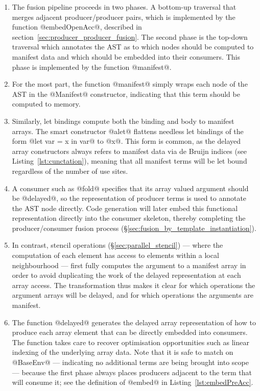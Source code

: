 \begin{enumerate}
\item The fusion pipeline proceeds in two phases. A bottom-up traversal that
    merges adjacent producer/producer pairs, which is implemented by the
    function @embedOpenAcc@, described in
    section~\ref{sec:producer_producer_fusion}. The second phase is the top-down
    traversal which annotates the AST as to which nodes should be computed to
    manifest data and which should be embedded into their consumers. This phase
    is implemented by the function @manifest@.

\item For the most part, the function @manifest@ simply wraps each node of the
    AST in the @Manifest@ constructor, indicating that this term should be
    computed to memory.

\item Similarly, let bindings compute both the binding and body to manifest
    arrays. The smart constructor @alet@ flattens needless let bindings of the
    form @let var = x in var@ to @x@. This form is common, as the delayed array
    constructors always refers to manifest data via de Bruijn indices (see
    Listing~\ref{lst:cunctation}), meaning that all manifest terms will be let
    bound regardless of the number of use sites.

\item A consumer such as @fold@ specifies that its array valued argument should
    be @delayed@, so the representation of producer terms is used to annotate
    the AST node directly. Code generation will later embed this functional
    representation directly into the consumer skeleton, thereby completing the
    producer/consumer fusion process
    (\S\ref{sec:fusion_by_template_instantiation}).

\item In contrast, stencil operations (\S\ref{sec:parallel_stencil}) --- where
    the computation of each element has access to elements within a local
    neighbourhood --- first fully computes the argument to a manifest array in
    order to avoid duplicating the work of the delayed representation at each
    array access. The transformation thus makes it clear for which operations
    the argument arrays will be delayed, and for which operations the arguments
    are manifest.

\item The function @delayed@ generates the delayed array representation of how
    to produce each array element that can be directly embedded into consumers.
    The function takes care to recover optimisation opportunities such as linear
    indexing of the underlying array data. Note that it is safe to match on
    @BaseEnv@ --- indicating no additional terms are being brought into scope
    --- because the first phase always places producers adjacent to the term
    that will consume it; see the definition of @embed@ in
    Listing~\ref{lst:embedPreAcc}.

\end{enumerate}

